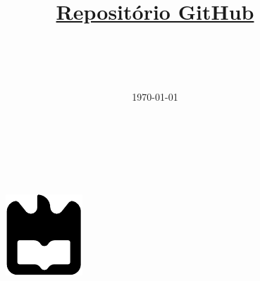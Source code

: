 \documentclass{report}
\begin{document}

%
%
\begin{titlepage}

\begin{center}
%
\vspace*{50mm}
%
{\Huge \titulo}\\
%
\vspace{10mm}
%
{\Large \empresa}\\
%
\vspace{10mm}
%
{\LARGE \autores}\\
%
\vspace{30mm}
%
\begin{figure}[h]
\center
\includegraphics{images/ua}\label{fig:ua-title-logo}
\end{figure}
%
\end{center}
\end{titlepage}

\title{%
{\Huge\textbf{\titulo}}\\
\vspace{10mm}
\Large\href{https://github.com/TiagoRG/aed-project2}{\textbf{Repositório GitHub}}\\
\vspace{15mm}
{\Large \departamento\\ \empresa}
}
%
\author{%
    \autores \\
    \autorescontactos
}
%
\date{\today}
%
\maketitle





\tableofcontents


\clearpage
{}













% 


\end{document}
